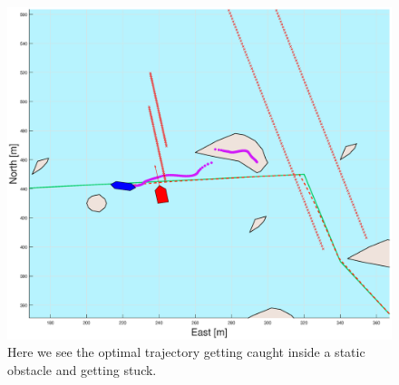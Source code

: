 \clearpage
\begin{figure}[!ht] %
    \centering
    \includegraphics[width=\textwidth]{Images/Figures/Extra_Stuff/w_optstuck}
    \caption{Here we see the optimal trajectory getting caught inside a static obstacle and getting stuck.}
    \label{FIG: wopt stuck in static obstacle}
\end{figure}

